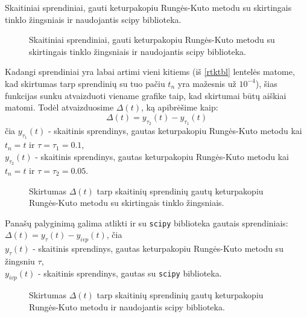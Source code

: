 \documentclass[]{VUMIFTemplateClass}
\newcommand{\tone}{0.1}
\newcommand{\ttwo}{0.05}
\begin{document}
\begin{table}[H]
    \begin{center}
        
    \end{center}
    \caption{Skaitiniai sprendiniai, gauti keturpakopiu Rungės-Kuto metodu su skirtingais tinklo žingsniais ir naudojantis scipy biblioteka.}
    \label{rtktbl}
\end{table}

\begin{figure}[H]
    \begin{center}
        
    \end{center}
    \caption{Skaitiniai sprendiniai, gauti keturpakopiu Rungės-Kuto metodu su skirtingais tinklo žingsniais ir naudojantis scipy biblioteka.}
\end{figure}

Kadangi sprendiniai yra labai artimi vieni kitiems (iš \ref{rtktbl} lentelės matome, kad skirtumas tarp sprendinių su tuo pačiu $t_n$ yra mažesnis už $10^{-4}$), šias funkcijas sunku atvaizduoti viename grafike taip, kad skirtumai būtų aiškiai matomi. Todėl atvaizduosime $\Delta(t)$, ką apibrėšime kaip:\\
\[ \Delta(t) = y_{\tau_2}(t) - y_{\tau_1}(t) \]
čia $y_{\tau_1}(t)$ - skaitinis sprendinys, gautas keturpakopiu Rungės-Kuto metodu kai $t_n = t$ ir $\tau = \tau_1 = \tone$,\\
$y_{\tau_2}(t)$ - skaitinis sprendinys, gautas keturpakopiu Rungės-Kuto metodu kai $t_n = t$ ir $\tau = \tau_2 = \ttwo$.

\begin{figure}[H]
    \begin{center}
        
    \end{center}
    \caption{Skirtumas $\Delta(t)$ tarp skaitinių sprendinių gautų keturpakopiu Rungės-Kuto metodu su skirtingais tinklo žingsniais.}
\end{figure}

Panašų palyginimą galima atlikti ir su \texttt{scipy} biblioteka gautais sprendiniais:\\
$\Delta(t) = y_{\tau}(t) - y_{ivp}(t)$, čia\\
$y_{\tau}(t)$ - skaitinis sprendinys, gautas keturpakopiu Rungės-Kuto metodu su žingsniu $\tau$,\\
$y_{ivp}(t)$ - skaitinis sprendinys, gautas su \texttt{scipy} biblioteka.
\begin{figure}[H]
    \begin{center}
        
    \end{center}
    \caption{Skirtumas $\Delta(t)$ tarp skaitinių sprendinių gautų keturpakopiu Rungės-Kuto metodu ir naudojantis scipy biblioteka.}
\end{figure}
\end{document}
